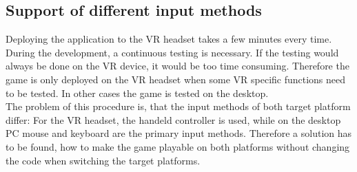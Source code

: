 \subsection{Support of different input methods}
\label{inputmethods}
Deploying the application to the VR headset takes a few minutes every time. During the development, a continuous testing is necessary. If the testing would always be done on the VR device, it would be too time consuming. Therefore the game is only deployed on the VR headset when some VR specific functions need to be tested. In other cases the game is tested on the desktop. \\
The problem of this procedure is, that the input methods of both target platform differ: For the VR headset, the handeld controller is used, while on the desktop PC mouse and keyboard are the primary input methods. Therefore a solution has to be found, how to make the game playable on both platforms without changing the code when switching the target platforms.

